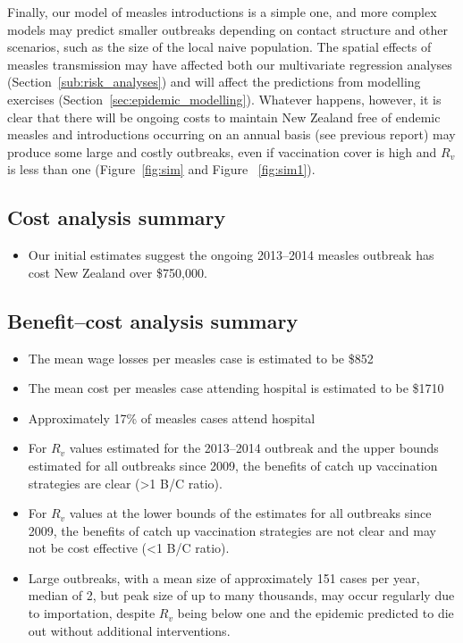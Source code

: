 \documentclass{article}
\begin{document}
Finally, our model of measles introductions is a simple one, and more complex models may predict smaller outbreaks depending on contact structure and other scenarios, such as the size of the local naive population. The spatial effects of measles transmission may have affected both our multivariate regression analyses (Section~\ref{sub:risk_analyses}) and will affect the predictions from modelling exercises (Section~\ref{sec:epidemic_modelling}). Whatever happens, however, it is clear that there will be ongoing costs to maintain New Zealand free of endemic measles and introductions occurring on an annual basis (see previous report) may produce some large and costly outbreaks, even if vaccination cover is high and $R_v$ is less than one (Figure~\ref{fig:sim} and Figure ~\ref{fig:sim1}).

\subsection{Cost analysis summary}


\begin{itemize}
\item Our initial estimates suggest the ongoing 2013--2014 measles outbreak has cost New Zealand over \$750,000.
\end{itemize}

\subsection{Benefit--cost analysis summary}
\begin{itemize}
\item The mean wage losses per measles case is estimated to be \$852
\item The mean cost per measles case attending hospital is estimated to be \$1710
\item Approximately 17\% of measles cases attend hospital
\item For $R_v$ values estimated for the 2013--2014 outbreak and the upper bounds estimated for all outbreaks since 2009, the benefits of catch up vaccination strategies are clear (>1 B/C ratio).
\item For $R_v$ values at the lower bounds of the estimates for all outbreaks since 2009, the benefits of catch up vaccination strategies are not clear and may not be cost effective (<1 B/C ratio).
\item Large outbreaks, with a mean size of approximately 151 cases per year, median of 2, but peak size of up to many thousands, may occur regularly due to importation, despite $R_v$ being below one and the epidemic predicted to die out without additional interventions.
\end{itemize}
\end{document}
